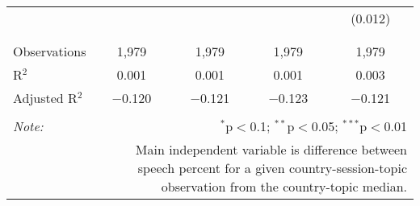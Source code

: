 \begin{table}[!htbp]
\begin{tabular}{@{\extracolsep{5pt}}lcccc}
  &  &  &  & (0.012) \\ 
  & & & & \\ 
\hline \\[-1.8ex] 
Observations & 1,979 & 1,979 & 1,979 & 1,979 \\ 
R$^{2}$ & 0.001 & 0.001 & 0.001 & 0.003 \\ 
Adjusted R$^{2}$ & $-$0.120 & $-$0.121 & $-$0.123 & $-$0.121 \\ 
\hline 
\hline \\[-1.8ex] 
\textit{Note:}  & \multicolumn{4}{r}{$^{*}$p$<$0.1; $^{**}$p$<$0.05; $^{***}$p$<$0.01} \\ 
 & \multicolumn{4}{r}{Main independent variable is difference between speech percent for a given country-session-topic observation from the country-topic median.} \\ 
\end{tabular} 
\end{table} 
